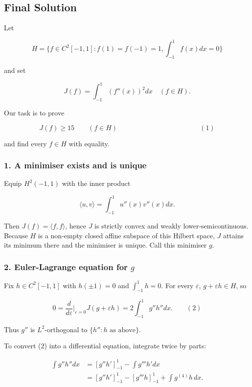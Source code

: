 \documentclass[12pt,a4paper]{article}
\theoremstyle{definition}
\begin{document}
    \subsection{Final Solution}
    Let

    $$H = \{f\in C^2[-1,1] : f(1)=f(-1)=1 ,  \int_{-1}^{1}f(x)dx = 0\}$$

    and set

    $$J(f)=\int_{-1}^{1}(f''(x))^2dx \quad (f\in H).$$

    Our task is to prove

    $$J(f) \geq 15\quad\quad(f\in H) \qquad\qquad\qquad\qquad\qquad\qquad (1)$$

    and find every $f\in H$ with equality.

    \hrulefill
    \subsubsection*{1. A minimiser exists and is unique}
    \hrulefill

    Equip $H^2(-1,1)$ with the inner product

    $$\langle u,v\rangle = \int_{-1}^{1} u''(x)v''(x)dx .$$

    Then $J(f)=\langle f,f\rangle$, hence $J$ is strictly convex and weakly lower-semicontinuous.
    Because $H$ is a non-empty closed affine subspace of this Hilbert space, $J$
    attains its minimum there and the minimiser is unique.
    Call this minimiser $g$.

    \hrulefill
    \subsubsection*{2. Euler-Lagrange equation for $g$}
    \hrulefill

    Fix $h\in C^2[-1,1]$ with $h(\pm1)=0$ and $\int_{-1}^{1}h=0$.
    For every $\varepsilon$, $g+\varepsilon h\in H$, so

    $$0 = \frac{d}{d\varepsilon}\bigg|_{\varepsilon=0} J(g+\varepsilon h) = 2\int_{-1}^{1}g''h''dx. \qquad (2)$$

    Thus $g''$ is $L^2$-orthogonal to $\{h'': h \text{ as above}\}$.

    To convert (2) into a differential equation, integrate twice by parts:

    \begin{align}
        \int g''h''dx &= [g''h']_{-1}^{1} - \int g'''h'dx\\
        &= [g''h']_{-1}^{1} - [g'''h]_{-1}^{1} + \int g^{(4)}h \, dx.
    \end{align}
\end{document}
